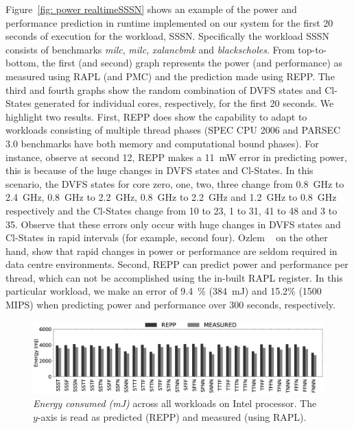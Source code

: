 Figure~\ref{fig: power realtimeSSSN} shows an example of the power and performance
prediction in runtime implemented on our system for the first 20 seconds of execution for
the workload, SSSN. Specifically the workload SSSN consists of benchmarks \emph{milc},
\emph{milc}, \emph{xalancbmk} and \emph{blackscholes}. From top-to-bottom, the first (and
second) graph represents the power (and performance) as measured using RAPL (and PMC) and
the prediction made using REPP. The third and fourth graphs show the random combination
of DVFS states and Cl-States generated for individual cores, respectively, for the first 20
seconds. We highlight two results. First, REPP does show the capability to adapt to
workloads consisting of multiple thread phases (SPEC CPU 2006 and PARSEC 3.0 benchmarks
have both memory and computational bound phases).  For instance, observe at second 12,
REPP makes a \SI{11}{\milli\watt} error in predicting power, this is because of the huge
changes in DVFS states and Cl-States. In this scenario, the DVFS states for core zero, one, two,
three change from \SI{0.8}{\giga\hertz} to \SI{2.4}{\giga\hertz}, \SI{0.8}{\giga\hertz} to
\SI{2.2}{\giga\hertz}, \SI{0.8}{\giga\hertz} to \SI{2.2}{\giga\hertz} and
\SI{1.2}{\giga\hertz} to \SI{0.8}{\giga\hertz} respectively and the Cl-States change from
10 to 23, 1 to 31, 41 to 48 and 3 to 35. Observe that these errors only occur with huge
changes in DVFS states and Cl-States in rapid intervals (for example, second four).  Ozlem
\etal~\citep{Bilgir_exploringthe} on the other hand, show that rapid changes in power or
performance are seldom required in data centre environments. Second, REPP can predict
power and performance per thread, which can not be accomplished using the in-built RAPL
register. In this particular workload, we make an error of \SI{9.4}{\percent}
(\SI{384}{\milli\joule}) and 15.2\% (1500 MIPS) when predicting power and performance over
300 seconds, respectively. 

\begin{figure}[t]
   \centering
    \includegraphics[width=\textwidth]{Chapter3/Figs/technical/power-paae.eps}
    \caption[Power prediction with multiple workloads without constraints]{ \textit{Energy consumed (\si{\milli\joule})} across all workloads on Intel processor. The $y$-axis is read as predicted (REPP) and measured (using RAPL).}
    \label{fig: power workloadswithout}
\end{figure}

